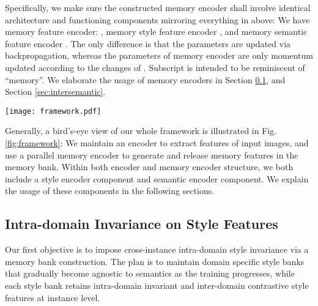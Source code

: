 \documentclass[10pt,twocolumn,letterpaper]{article}
\newcommand{\0}{{\bf 0}}
\begin{document}
Specifically, we make sure the constructed memory encoder shall involve identical architecture and functioning components mirroring everything in  above: We have memory feature encoder: , memory style feature encoder , and memory semantic feature encoder . The only difference is that the parameters   are updated via backpropagation, whereas the parameters of memory encoder  are only momentum updated according to the changes of . Subscript  is intended to be reminiscent of ``memory''. We elaborate the usage of memory encoders in Section \ref{sec:intrastyle}, and Section \ref{sec:intersemantic}.

\begin{figure*}[th!]
\begin{center}
\vspace{-0.2in}
\texttt{[image: framework.pdf]}
\end{center}
\vspace{-0.2in}
\caption{The framework of STEAM. We train an encoder for style and semantic feature extraction. We maintain a memory encoder to obtain  number of parallel style memory banks and one semantic memory bank. We use contrastive loss based on style banks to achieve intra-domain style invariance. We construct a memory semantic feature bank (``jury'') to achieve inter-domain semantic invariance.}
\label{fig:framework}
\vspace{-0.2in}
\end{figure*}

Generally, a bird's-eye view of our whole framework is illustrated in Fig. {\ref{fig:framework}}: We maintain an encoder to extract features of input images, and use a parallel memory encoder to generate and release memory features in the memory bank.  Within both encoder and memory encoder structure, we both include a style encoder component and semantic encoder component. We explain the usage of these components in the following sections.

\subsection{Intra-domain Invariance on Style Features} \label{sec:intrastyle}
Our first objective is to impose cross-instance intra-domain style invariance via a memory bank construction. The plan is to maintain  domain specific style banks that gradually become agnostic to semantics as the training progresses, while each style bank retains intra-domain invariant and inter-domain contrastive style features at instance level.
\end{document}
